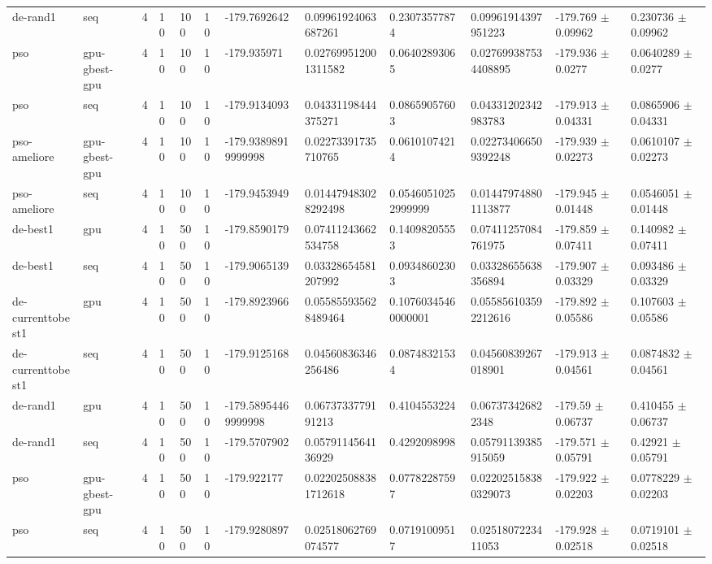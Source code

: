\begin{table}[t]
\begin{tabular}{llllllllllll}
de-rand1 & seq & 4 & 10 & 100 & 10 & -179.7692642 & 0.09961924063687261 & 0.23073577874 & 0.09961914397951223 & -179.769 $\pm$ 0.09962 & 0.230736 $\pm$ 0.09962 \\
pso & gpu-gbest-gpu & 4 & 10 & 100 & 10 & -179.935971 & 0.027699512001311582 & 0.06402893065 & 0.027699387534408895 & -179.936 $\pm$ 0.0277 & 0.0640289 $\pm$ 0.0277 \\
pso & seq & 4 & 10 & 100 & 10 & -179.9134093 & 0.04331198444375271 & 0.08659057603 & 0.04331202342983783 & -179.913 $\pm$ 0.04331 & 0.0865906 $\pm$ 0.04331 \\
pso-ameliore & gpu-gbest-gpu & 4 & 10 & 100 & 10 & -179.93898919999998 & 0.02273391735710765 & 0.06101074214 & 0.022734066509392248 & -179.939 $\pm$ 0.02273 & 0.0610107 $\pm$ 0.02273 \\
pso-ameliore & seq & 4 & 10 & 100 & 10 & -179.9453949 & 0.014479483028292498 & 0.05460510252999999 & 0.014479748801113877 & -179.945 $\pm$ 0.01448 & 0.0546051 $\pm$ 0.01448 \\
de-best1 & gpu & 4 & 10 & 500 & 10 & -179.8590179 & 0.07411243662534758 & 0.14098205553 & 0.07411257084761975 & -179.859 $\pm$ 0.07411 & 0.140982 $\pm$ 0.07411 \\
de-best1 & seq & 4 & 10 & 500 & 10 & -179.9065139 & 0.03328654581207992 & 0.09348602303 & 0.03328655638356894 & -179.907 $\pm$ 0.03329 & 0.093486 $\pm$ 0.03329 \\
de-currenttobest1 & gpu & 4 & 10 & 500 & 10 & -179.8923966 & 0.055855935628489464 & 0.10760345460000001 & 0.055856103592212616 & -179.892 $\pm$ 0.05586 & 0.107603 $\pm$ 0.05586 \\
de-currenttobest1 & seq & 4 & 10 & 500 & 10 & -179.9125168 & 0.04560836346256486 & 0.08748321534 & 0.04560839267018901 & -179.913 $\pm$ 0.04561 & 0.0874832 $\pm$ 0.04561 \\
de-rand1 & gpu & 4 & 10 & 500 & 10 & -179.58954469999998 & 0.0673733779191213 & 0.4104553224 & 0.067373426822348 & -179.59 $\pm$ 0.06737 & 0.410455 $\pm$ 0.06737 \\
de-rand1 & seq & 4 & 10 & 500 & 10 & -179.5707902 & 0.0579114564136929 & 0.4292098998 & 0.05791139385915059 & -179.571 $\pm$ 0.05791 & 0.42921 $\pm$ 0.05791 \\
pso & gpu-gbest-gpu & 4 & 10 & 500 & 10 & -179.922177 & 0.022025088381712618 & 0.07782287597 & 0.022025158380329073 & -179.922 $\pm$ 0.02203 & 0.0778229 $\pm$ 0.02203 \\
pso & seq & 4 & 10 & 500 & 10 & -179.9280897 & 0.02518062769074577 & 0.07191009517 & 0.0251807223411053 & -179.928 $\pm$ 0.02518 & 0.0719101 $\pm$ 0.02518 \\

\end{tabular}
\end{table}

